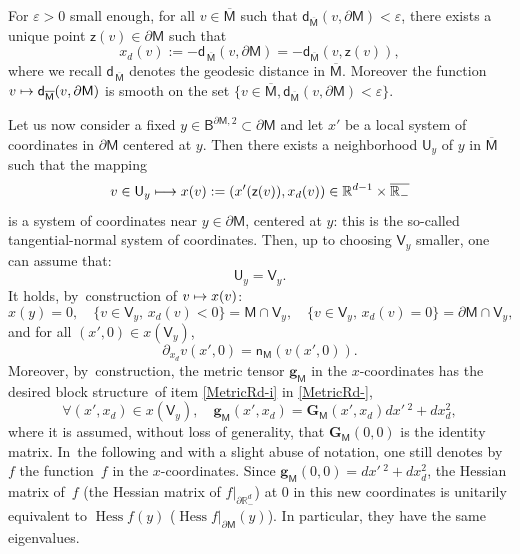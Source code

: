 \documentclass[JEP,XML,SOM,Unicode,NoEqCountersInSection,NoFloatCountersInSection,published]{cedram}
\newcommand\mto{\mathchoice{\longmapsto}{\mapsto}{\mapsto}{\mapsto}}
\newcommand{\mbf}[1]{\mathbf{#1}}
\let\pa\partial
\let\ve\varepsilon
\DeclareMathOperator{\hess}{Hess}\let\Hess\hess
\theoremstyle{plain}
\theoremstyle{definition}
\begin{document}
For $\ve>0$ small enough, for all $v\in \overline { \mathsf M}$ such that $\mathsf d_{\overline { \mathsf M}}(v,\pa \mathsf M)<\ve$, there exists a unique
point $\mathsf z(v)\in \pa \mathsf M$ such that
\[
x_d(v):=-\mathsf d_{\, \overline {\mathsf M}}(v,\pa \mathsf M)=-\mathsf d_{ \overline {\mathsf M}}(v,\mathsf z(v)),
\]
where we recall $\mathsf d_{\, \overline{\mathsf M}}$ denotes the
geodesic distance in $ \overline {\mathsf M}$. Moreover the function
$v\mto \mathsf d_{ \overline {\mathsf M}}(v,\partial \mathsf M)$ is smooth on the set $\{v\in \overline {\mathsf M}, \mathsf d_{\overline{ \mathsf M}}(v,\pa {\mathsf M})<\ve\}$.

Let us now consider a fixed $y\in \mathsf B^{\pa \mathsf M,2}\subset \pa \mathsf M$ and let $x'$ be a local system of coordinates in $\pa \mathsf M$ centered at $y$. Then there exists a neighborhood $\mathsf U_y$ of $y$ in $\overline {\mathsf M}$ such that the mapping\begin{equation}\label{eq.norm-teng}
v\in \mathsf U_y \mto x(v):=(x'(\mathsf z(v)),x_d(v))\in \mathbb R^{d-1}\times \overline{\mathbb R_-}
\end{equation}
is a system of coordinates near $y\in \pa \mathsf M$, centered at
$y$: this is the so-called tangential-normal system of coordinates. Then, up to choosing $\mathsf V_y$ smaller, one can assume that:
\[
\mathsf U_y=\mathsf V_y.
\]
It holds, by~construction of $v\mto x(v)$:
\[
x(y)=0,\quad \{v\in \mathsf V_y, \, x_d(v)<0\}= \mathsf M\cap \mathsf V_y,\quad
\{v\in \mathsf V_y,\, x_d(v)=0\}=\pa \mathsf M \cap \mathsf V_y,
\]
and for all $(x',0)\in x(\mathsf V_y)$,
\[
\pa _{x_d}v(x',0) = \mathsf n_{\mathsf M}(v(x',0)).
\]
Moreover, by~construction, the metric tensor $\mbf g_{\mathsf M}$ in the $x$-coordinates has the desired block structure~of item \eqref{MetricRd-i} in \ref{MetricRd-}, \ie
\begin{equation}\label{g_y}
\forall (x',x_d)\in x(\mathsf V_y), \quad \mbf g_{\mathsf M}(x',x_d)=\mbf G_{\mathsf M}(x',x_d)dx'\,^2+dx_d^2,
\end{equation}
where it is assumed, without loss of generality, that $\mbf G_{\mathsf
M} (0,0)$ is the identity matrix. In~the following and with a slight abuse of notation, one still
denotes by $f$ the function~$f$ in the $x$-coordinates. Since $\mbf
g_{\mathsf M}(0,0)= dx'\,^2+dx_d^2$, the
Hessian matrix of~$f$ (\resp the Hessian matrix of
$f|_{\partial \mathbb R_-^d}$) at $0$ in this new coordinates is unitarily equivalent
to $\hess f(y)$ (\resp $\hess f|_{\partial \mathsf M}(y)$). In
particular, they have the same eigenvalues.
\end{document}
